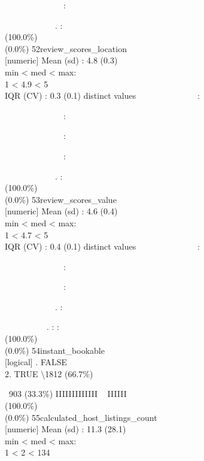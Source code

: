 \documentclass[
  journal,
]{IEEEtran}%
\begin{document}
\strut ~~~~~~~~~~~~~~:\\
\strut ~~~~~~~~~~~~. : \\
(100.0\%) \\
(0.0\%) \textbar{} \textbar{} 52\textbar review\_scores\_location\\
{[}numeric{]} \textbar Mean (sd) : 4.8 (0.3)\\
min \textless{} med \textless{} max:\\
1 \textless{} 4.9 \textless{} 5\\
IQR (CV) : 0.3 (0.1)  distinct values \textbar{}
\textbar~~~~~~~~~~~~~~:\\
\strut ~~~~~~~~~~~~~~:\\
\strut ~~~~~~~~~~~~~~:\\
\strut ~~~~~~~~~~~~~~:\\
\strut ~~~~~~~~~~~~. : \\
(100.0\%) \\
(0.0\%) \textbar{} \textbar{} 53\textbar review\_scores\_value\\
{[}numeric{]} \textbar Mean (sd) : 4.6 (0.4)\\
min \textless{} med \textless{} max:\\
1 \textless{} 4.7 \textless{} 5\\
IQR (CV) : 0.4 (0.1)  distinct values \textbar{}
\textbar~~~~~~~~~~~~~~:\\
\strut ~~~~~~~~~~~~~~:\\
\strut ~~~~~~~~~~~~~~:\\
\strut ~~~~~~~~~~~~. :\\
\strut ~~~~~~~~~~. : : \\
(100.0\%) \\
(0.0\%) \textbar{} \textbar{} 54\textbar instant\_bookable\\
{[}logical{]} . FALSE\\
2. TRUE \textbar\textbackslash1812 (66.7\%)\\
\strut ~903 (33.3\%) \textbar{} \textbar IIIIIIIIIIIII ~ IIIIII
\\
(100.0\%) \\
(0.0\%) \textbar{} \textbar{}
55\textbar calculated\_host\_listings\_count\\
{[}numeric{]} \textbar Mean (sd) : 11.3 (28.1)\\
min \textless{} med \textless{} max:\\
1 \textless{} 2 \textless{} 134\\
\end{document}
